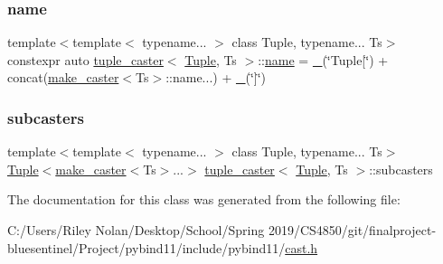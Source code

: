 \subsubsection{\texorpdfstring{name}{name}}
{\footnotesize\ttfamily template$<$template$<$ typename... $>$ class Tuple, typename... Ts$>$ \\
constexpr auto \mbox{\hyperlink{classtuple__caster}{tuple\+\_\+caster}}$<$ \mbox{\hyperlink{_python-ast_8h_a3f332c0be139cb870e516bad9b6a9366}{Tuple}}, Ts $>$\+::\mbox{\hyperlink{structname}{name}} = \mbox{\hyperlink{descr_8h_af114703e20c6527e87163eb2798f74b8}{\+\_\+}}(\char`\"{}Tuple\mbox{[}\char`\"{}) + concat(\mbox{\hyperlink{cast_8h_ab32b52411a6b07420516d79074815713}{make\+\_\+caster}}$<$Ts$>$\+::name...) + \mbox{\hyperlink{descr_8h_af114703e20c6527e87163eb2798f74b8}{\+\_\+}}(\char`\"{}\mbox{]}\char`\"{})\hspace{0.3cm}{\ttfamily [static]}}

\mbox{\label{classtuple__caster_a5a772e6404951d9cbfdfb9d06d342de1}} 
\subsubsection{\texorpdfstring{subcasters}{subcasters}}
{\footnotesize\ttfamily template$<$template$<$ typename... $>$ class Tuple, typename... Ts$>$ \\
\mbox{\hyperlink{_python-ast_8h_a3f332c0be139cb870e516bad9b6a9366}{Tuple}}$<$\mbox{\hyperlink{cast_8h_ab32b52411a6b07420516d79074815713}{make\+\_\+caster}}$<$Ts$>$...$>$ \mbox{\hyperlink{classtuple__caster}{tuple\+\_\+caster}}$<$ \mbox{\hyperlink{_python-ast_8h_a3f332c0be139cb870e516bad9b6a9366}{Tuple}}, Ts $>$\+::subcasters\hspace{0.3cm}{\ttfamily [protected]}}



The documentation for this class was generated from the following file\+:\begin{DoxyCompactItemize}
\item 
C\+:/\+Users/\+Riley Nolan/\+Desktop/\+School/\+Spring 2019/\+C\+S4850/git/finalproject-\/bluesentinel/\+Project/pybind11/include/pybind11/\mbox{\hyperlink{cast_8h}{cast.\+h}}\end{DoxyCompactItemize}

